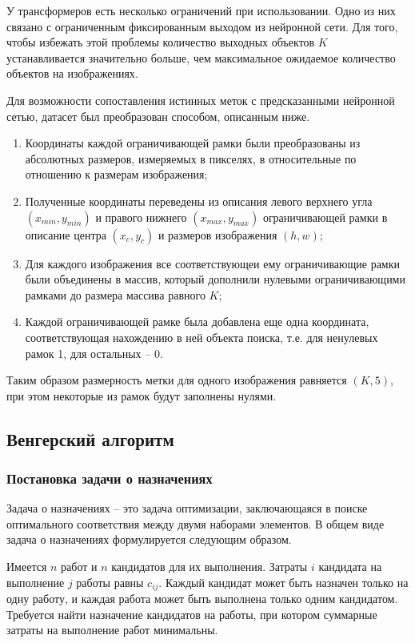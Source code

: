 \documentclass[14pt,a4paper]{extarticle}
\begin{document}
У трансформеров есть несколько ограничений при использовании. Одно из них связано с ограниченным фиксированным выходом из нейронной сети. Для того, чтобы избежать этой проблемы количество выходных объектов $K$ устанавливается значительно больше, чем максимальное ожидаемое количество объектов на изображениях. 

Для возможности сопоставления истинных меток с предсказанными нейронной сетью, датасет был преобразован способом, описанным ниже.
\begin{enumerate}
\item Координаты каждой ограничивающей рамки были преобразованы из абсолютных размеров, измеряемых в пикселях, в относительные по отношению к размерам изображения;
\item Полученные координаты переведены из описания левого верхнего угла $(x_{min}, y_{min})$ и правого нижнего $(x_{max}, y_{max})$ ограничивающей рамки в описание центра $(x_{c}, y_{c})$ и размеров изображения $(h, w)$;
\item Для каждого изображения все соответствующеи ему ограничивающие рамки были объединены в массив, который дополнили нулевыми ограничивающими рамками до размера массива равного $K$;
\item Каждой ограничивающей рамке была добавлена еще одна координата, соответствующая нахождению в ней объекта поиска, т.е. для ненулевых рамок 1, для остальных -- 0.
\end{enumerate}
Таким образом размерность метки для одного изображения равняется $(K, 5)$, при этом некоторые из рамок будут заполнены нулями.
\newpage
\subsection{Венгерский алгоритм}
\subsubsection*{Постановка задачи о назначениях}
Задача о назначениях -- это задача оптимизации, заключающаяся в поиске оптимального соответствия между двумя наборами элементов. В общем виде задача о назначениях формулируется следующим образом. 

Имеется $n$ работ и $n$ кандидатов для их выполнения. Затраты $i$ кандидата на выполнение $j$ работы равны $c_{ij}$. Каждый кандидат может быть назначен только на одну работу, и каждая работа может быть выполнена только одним кандидатом. Требуется найти назначение кандидатов на работы, при котором суммарные затраты на выполнение работ минимальны. 
\end{document}
